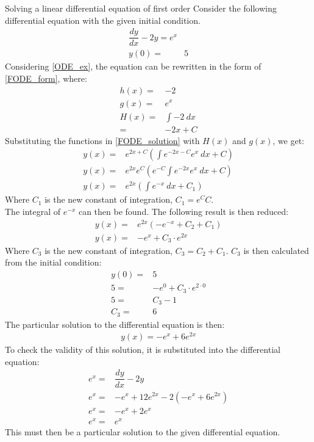 \begin{example}{Solving a linear differential equation of first order}{}
Consider the following differential equation with the given initial condition.
\begin{align}
	\dfrac{dy}{dx}-2y=e^x  \label{ODE_ex}\\ 
	y(0) =& 5 \nonumber
\end{align}
Considering \eqref{ODE_ex}, the equation can be rewritten in the form of \eqref{FODE_form}, where:
\begin{align*}
	h(x) =& -2 \\
	g(x) =& e^x \\
	H(x) =& \int{-2 \ dx} \\
	     =& -2x + C
\end{align*}
Substituting the functions in \eqref{FODE_solution} with $H(x)$ and $g(x)$, we get: 
\begin{align*}
	y(x)=&e^{2x+C}(\int{e^{-2x-C}e^x\ dx}+C) \\
	y(x)=&e^{2x}e^{C}(e^{-C}\int{e^{-2x}e^{x}\ dx}+C) \\
	y(x)=&e^{2x}(\int{e^{-x}\ dx}+C_{1})
\end{align*}
Where $C_{1}$ is the new constant of integration, $C_1=e^{C}C$. \\
The integral of $e^{-x}$ can then be found. The following result is then reduced:
\begin{align*}
	y(x)=&e^{2x}(-e^{-x}+C_{2}+C_{1}) \\
	y(x)=&-e^x+C_{3} \cdot e^{2x}
\end{align*}
Where $C_{3}$ is the new constant of integration, $C_{3}=C_{2}+C_{1}$. $C_{3}$ is then calculated from the initial condition:
\begin{align*}
	y(0)=&5 \\
	5=&-e^0+C_{3} \cdot e^{2 \cdot 0} \\
	5 =& C_{3}-1 \\
	C_{3} =& 6
\end{align*}
The particular solution to the differential equation is then:
\begin{align*}
	y(x) = -e^x+6e^{2x}
\end{align*}
To check the validity of this solution, it is substituted into the differential equation:
\begin{align*}
	e^x =& \dfrac{dy}{dx} -2y \\
	e^x =& -e^x+12e^{2x} -2(-e^x+6e^{2x})  \\
	e^x =& -e^x+2e^x  \\
	e^x =& e^x
\end{align*}
This must then be a particular solution to the given differential equation.
\end{example}

